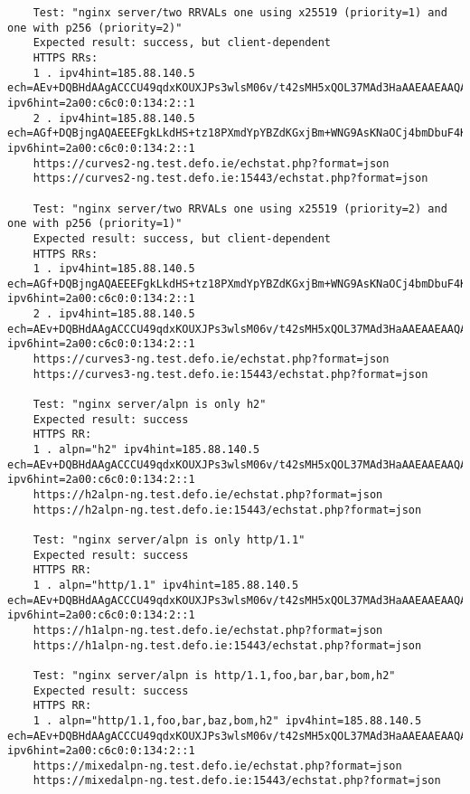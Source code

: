 \begin{verbatim}
    Test: "nginx server/two RRVALs one using x25519 (priority=1) and one with p256 (priority=2)"
    Expected result: success, but client-dependent
    HTTPS RRs:
    1 . ipv4hint=185.88.140.5 ech=AEv+DQBHdAAgACCCU49qdxKOUXJPs3wlsM06v/t42sMH5xQOL37MAd3HaAAEAAEAAQAYb3RoZXJwdWJsaWMudGVzdC5kZWZvLmllAAA= ipv6hint=2a00:c6c0:0:134:2::1
    2 . ipv4hint=185.88.140.5 ech=AGf+DQBjngAQAEEEFgkLkdHS+tz18PXmdYpYBZdKGxjBm+WNG9AsKNaOCj4bmDbuF4KyvHEZGj6+Wls1VBe1OXierpjGiYOEriOWnAAEAAIAAwATcHVibGljLnRlc3QuZGVmby5pZQAA ipv6hint=2a00:c6c0:0:134:2::1
    https://curves2-ng.test.defo.ie/echstat.php?format=json
    https://curves2-ng.test.defo.ie:15443/echstat.php?format=json

    Test: "nginx server/two RRVALs one using x25519 (priority=2) and one with p256 (priority=1)"
    Expected result: success, but client-dependent
    HTTPS RRs:
    1 . ipv4hint=185.88.140.5 ech=AGf+DQBjngAQAEEEFgkLkdHS+tz18PXmdYpYBZdKGxjBm+WNG9AsKNaOCj4bmDbuF4KyvHEZGj6+Wls1VBe1OXierpjGiYOEriOWnAAEAAIAAwATcHVibGljLnRlc3QuZGVmby5pZQAA ipv6hint=2a00:c6c0:0:134:2::1
    2 . ipv4hint=185.88.140.5 ech=AEv+DQBHdAAgACCCU49qdxKOUXJPs3wlsM06v/t42sMH5xQOL37MAd3HaAAEAAEAAQAYb3RoZXJwdWJsaWMudGVzdC5kZWZvLmllAAA= ipv6hint=2a00:c6c0:0:134:2::1
    https://curves3-ng.test.defo.ie/echstat.php?format=json
    https://curves3-ng.test.defo.ie:15443/echstat.php?format=json

    Test: "nginx server/alpn is only h2"
    Expected result: success
    HTTPS RR:
    1 . alpn="h2" ipv4hint=185.88.140.5 ech=AEv+DQBHdAAgACCCU49qdxKOUXJPs3wlsM06v/t42sMH5xQOL37MAd3HaAAEAAEAAQAYb3RoZXJwdWJsaWMudGVzdC5kZWZvLmllAAA= ipv6hint=2a00:c6c0:0:134:2::1
    https://h2alpn-ng.test.defo.ie/echstat.php?format=json
    https://h2alpn-ng.test.defo.ie:15443/echstat.php?format=json

    Test: "nginx server/alpn is only http/1.1"
    Expected result: success
    HTTPS RR:
    1 . alpn="http/1.1" ipv4hint=185.88.140.5 ech=AEv+DQBHdAAgACCCU49qdxKOUXJPs3wlsM06v/t42sMH5xQOL37MAd3HaAAEAAEAAQAYb3RoZXJwdWJsaWMudGVzdC5kZWZvLmllAAA= ipv6hint=2a00:c6c0:0:134:2::1
    https://h1alpn-ng.test.defo.ie/echstat.php?format=json
    https://h1alpn-ng.test.defo.ie:15443/echstat.php?format=json

    Test: "nginx server/alpn is http/1.1,foo,bar,bar,bom,h2"
    Expected result: success
    HTTPS RR:
    1 . alpn="http/1.1,foo,bar,baz,bom,h2" ipv4hint=185.88.140.5 ech=AEv+DQBHdAAgACCCU49qdxKOUXJPs3wlsM06v/t42sMH5xQOL37MAd3HaAAEAAEAAQAYb3RoZXJwdWJsaWMudGVzdC5kZWZvLmllAAA= ipv6hint=2a00:c6c0:0:134:2::1
    https://mixedalpn-ng.test.defo.ie/echstat.php?format=json
    https://mixedalpn-ng.test.defo.ie:15443/echstat.php?format=json


\end{verbatim}
